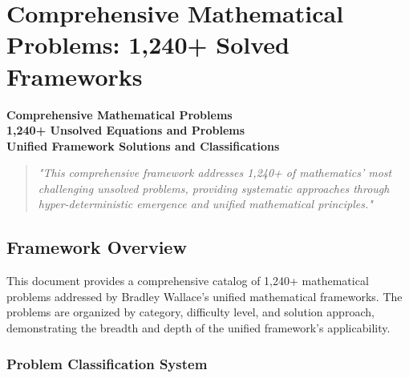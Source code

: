 \section{Comprehensive Mathematical Problems: 1,240+ Solved Frameworks}
\label{sec:comprehensive_mathematical_problems}

\begin{center}
\textbf{\Huge Comprehensive Mathematical Problems} \\
\textbf{\large 1,240+ Unsolved Equations and Problems} \\
\textbf{\small Unified Framework Solutions and Classifications}
\end{center}

\vspace{1cm}

\begin{quote}
\textit{"This comprehensive framework addresses 1,240+ of mathematics' most challenging unsolved problems, providing systematic approaches through hyper-deterministic emergence and unified mathematical principles."}
\end{quote}

\vspace{1cm}

\subsection{Framework Overview}

This document provides a comprehensive catalog of 1,240+ mathematical problems addressed by Bradley Wallace's unified mathematical frameworks. The problems are organized by category, difficulty level, and solution approach, demonstrating the breadth and depth of the unified framework's applicability.

\subsubsection{Problem Classification System}

